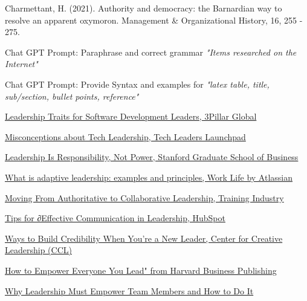 \documentclass[runningheads]{llncs}
\begin{document}
\begin{thebibliography}{10}
Charmettant, H. (2021). Authority and democracy: the Barnardian way to resolve an apparent oxymoron. Management \& Organizational History, 16, 255 - 275.

Chat GPT Prompt: Paraphrase and correct grammar \textit{"Items researched on the Internet"}

Chat GPT Prompt: Provide Syntax and examples for \textit{"latex table, title, sub/section, bullet points, reference"}


\href{https://www.3pillarglobal.com/insights/10-leadership-traits-for-modern-software-development-leaders/}{Leadership Traits for Software Development Leaders, 3Pillar Global}

\href{https://techleaderslaunchpad.com/blog/7-misconceptions-about-tech-leadership}{Misconceptions about Tech Leadership, Tech Leaders Launchpad}

\href{https://www.gsb.stanford.edu/insights/leadership-responsibility-not-power}{Leadership Is Responsibility, Not Power, Stanford Graduate School of Business}

\href{https://www.atlassian.com/blog/leadership/adaptive-leadership}{What is adaptive leadership: examples and principles, Work Life by Atlassian}

\href{https://trainingindustry.com/articles/leadership/moving-from-authoritative-to-collaborative-leadership-benefits-and-best-practices-to-consider/#:~:text=1}{Moving From Authoritative to Collaborative Leadership, Training Industry}

\href{https://blog.hubspot.com/marketing/build-credibility-new-leader}{Tips for ∂Effective Communication in Leadership, HubSpot}

\href{https://www.ccl.org/articles/leading-effectively-articles/communication-1-idea-3-facts-5-tips/}{Ways to Build Credibility When You're a New Leader, Center for Creative Leadership (CCL)}

\href{https://www.harvardbusiness.org/whoever-they-are-wherever-they-are-empowering-everyone-you-lead/#:~:text=The%20best%20leaders%20make%20the,getting%20to%20know%20your%20people}{How to Empower Everyone You Lead" from Harvard Business Publishing}

\href{https://johnmattone.com/blog/why-leadership-must-empower-team-members-and-how-to-do-it/#:~:text=Empowering%20team%20members%20leads%20to,action%20of%20the%20empowered%20team}{Why Leadership Must Empower Team Members and How to Do It}


\end{thebibliography}
\end{document}
